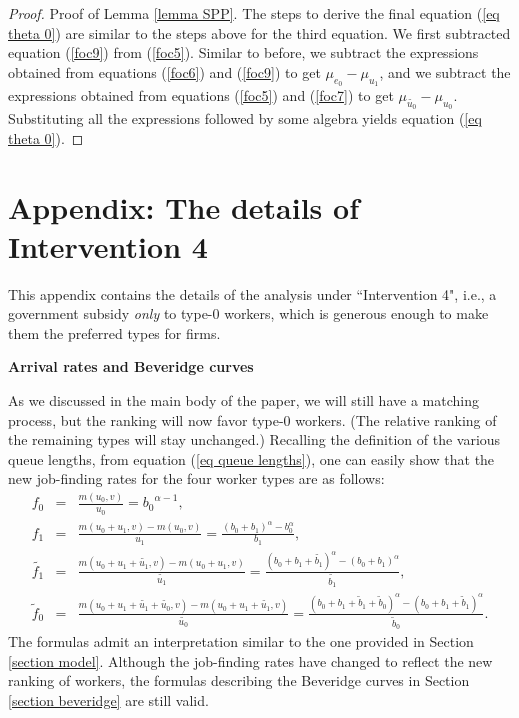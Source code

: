 \documentclass[12pt]{article} %
\theoremstyle{definition}
\begin{document}
\begin{appendix}
\begin{proof}{Proof of Lemma \ref{lemma SPP}.}
The steps to derive the final equation (\ref{eq theta 0}) are similar to the steps above for the third equation. We first subtracted equation (\ref{foc9}) from (\ref{foc5}). Similar to before, we subtract the expressions obtained from equations (\ref{foc6}) and (\ref{foc9}) to get $\mu_{e_0}-\mu_{u_1}$, and we subtract the expressions obtained from equations (\ref{foc5}) and (\ref{foc7}) to get $\mu_{\tilde{u_0}}-\mu_{u_0}$. Substituting all the expressions followed by some algebra yields equation (\ref{eq theta 0}).
\end{proof}

\fi






\section{Appendix: The details of Intervention 4 \label{section appendix intervention 4}}

This appendix contains the details of the analysis under ``Intervention 4", i.e., a government subsidy \textit{only} to type-0 workers, which is generous enough to make them the preferred types for firms. 

\medskip 

\noindent \textbf{Arrival rates and Beveridge curves}

\medskip 

\noindent As we discussed in the main body of the paper, we will still have a \cite{petrongolo2001looking} matching process, but the ranking will now favor type-0 workers. (The relative ranking of the remaining types will stay unchanged.) Recalling the definition of the various {queue lengths}, from equation (\ref{eq queue lengths}), one can easily show that the new job-finding rates for the four worker types are as follows: 
\begin{eqnarray*}
	f_0 &=& \frac{m(u_0,v)}{u_0} = {b_0}^{\alpha-1},\nonumber  \\
	{f_1} &=& \frac{m(u_0+{u_1},v)-m(u_0,v)}{{u_1}} = \frac{(b_0+{b}_1)^\alpha - b_0^\alpha}{{b}_1},\nonumber  \\
	\tilde{f_1} &=& \frac{m(u_0+u_1+\tilde{u_1},v)-m(u_0+{u_1},v)}{\tilde{u_1}} = \frac{(b_0+{b}_1+\tilde{b_1})^\alpha - (b_0+{b}_1)^\alpha}{\tilde{b_1}}, \nonumber \\
	\tilde{f}_0 &=& \frac{m(u_0+u_1+\tilde{u_1}+\tilde{u_0},v)-m(u_0+u_1+\tilde{u_1},v)}{\tilde{u_0}} = \frac{(b_0+b_1+\tilde{b}_1+\tilde{b}_0)^\alpha - ({b_0+b_1+\tilde{b}_1})^\alpha}{\tilde{b}_0}. \nonumber 
\end{eqnarray*}The formulas admit an interpretation similar to the one provided in Section \ref{section model}. Although the job-finding rates have changed to reflect the new ranking of workers, the formulas describing the Beveridge curves in Section \ref{section beveridge} are still valid.  


\end{appendix}
\end{document}
